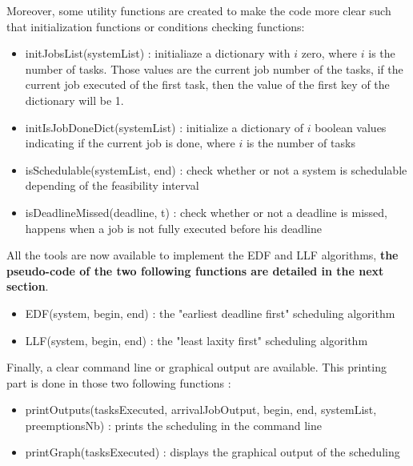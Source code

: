 \documentclass{article}
\begin{document}
Moreover, some utility functions are created to make the code more clear such that initialization functions or conditions checking functions:
\begin{itemize}
    \item {\selectfont initJobsList(systemList)} :  initialiaze a dictionary with $i$ zero, where $i$ is the number of tasks. Those values are the current job number of the tasks, if the current job executed of the first task, then the value of the first key of the dictionary will be 1. 
    \item {\selectfont initIsJobDoneDict(systemList)} : initialize a dictionary of $i$ boolean values indicating if the current job is done, where $i$ is the number of tasks
    \item {\selectfont isSchedulable(systemList, end)} : check whether or not a system is schedulable depending of the feasibility interval 
    \item {\selectfont isDeadlineMissed(deadline, t)} : check whether or not a deadline is missed, happens when a job is not fully executed before his deadline 
\end{itemize}

All the tools are now available to implement the EDF and LLF algorithms, \textbf{the pseudo-code of the two following functions are detailed in the next section}. 
\begin{itemize}
    \item {\selectfont EDF(system, begin, end)} : the "earliest deadline first" scheduling algorithm
    \item {\selectfont LLF(system, begin, end)} : the "least laxity first" scheduling algorithm
\end{itemize}

Finally, a clear command line or graphical output are available. This printing part is done in those two 
following functions : 

\begin{itemize}
    \item {\selectfont printOutputs(tasksExecuted, arrivalJobOutput, begin, end, systemList, preemptionsNb)} :  prints the scheduling in the command line 
    \item {\selectfont printGraph(tasksExecuted)} : displays the graphical output of the scheduling   
\end{itemize}
\end{document}
